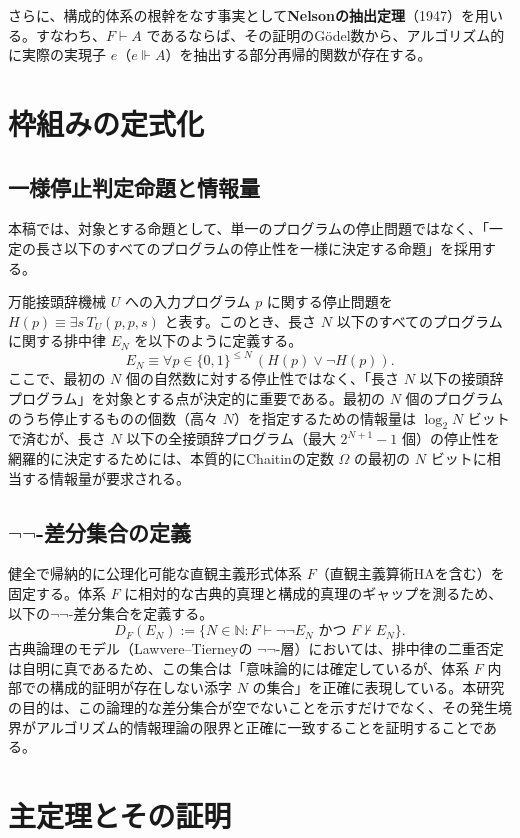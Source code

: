 \documentclass[a4paper,11pt]{ltjsarticle}
\theoremstyle{plain}
\begin{document}
さらに、構成的体系の根幹をなす事実として\textbf{Nelsonの抽出定理}（1947）を用いる。すなわち、$F \vdash A$ であるならば、その証明のGödel数から、アルゴリズム的に実際の実現子 $e$（$e \Vdash A$）を抽出する部分再帰的関数が存在する。


\section{枠組みの定式化}

\subsection{一様停止判定命題と情報量}

本稿では、対象とする命題として、単一のプログラムの停止問題ではなく、「一定の長さ以下のすべてのプログラムの停止性を一様に決定する命題」を採用する。

万能接頭辞機械 $U$ への入力プログラム $p$ に関する停止問題を $H(p) \equiv \exists s\, T_U(p, p, s)$ と表す。このとき、長さ $N$ 以下のすべてのプログラムに関する排中律 $E_N$ を以下のように定義する。
\[
E_N \equiv \forall p \in \{0, 1\}^{\le N}\, (H(p) \lor \neg H(p)).
\]
ここで、最初の $N$ 個の自然数に対する停止性ではなく、「長さ $N$ 以下の接頭辞プログラム」を対象とする点が決定的に重要である。最初の $N$ 個のプログラムのうち停止するものの個数（高々 $N$）を指定するための情報量は $\log_2 N$ ビットで済むが、長さ $N$ 以下の全接頭辞プログラム（最大 $2^{N+1}-1$ 個）の停止性を網羅的に決定するためには、本質的にChaitinの定数 $\Omega$ の最初の $N$ ビットに相当する情報量が要求される。

\subsection{$\neg\neg$-差分集合の定義}

健全で帰納的に公理化可能な直観主義形式体系 $F$（直観主義算術HAを含む）を固定する。体系 $F$ に相対的な古典的真理と構成的真理のギャップを測るため、以下の$\neg\neg$-差分集合を定義する。
\[
D_F(E_N) := \{ N \in \mathbb{N} : F \vdash \neg\neg E_N \text{ かつ } F \nvdash E_N \}.
\]
古典論理のモデル（Lawvere--Tierneyの $\neg\neg$-層）においては、排中律の二重否定は自明に真であるため、この集合は「意味論的には確定しているが、体系 $F$ 内部での構成的証明が存在しない添字 $N$ の集合」を正確に表現している。本研究の目的は、この論理的な差分集合が空でないことを示すだけでなく、その発生境界がアルゴリズム的情報理論の限界と正確に一致することを証明することである。

\section{主定理とその証明}
\end{document}
